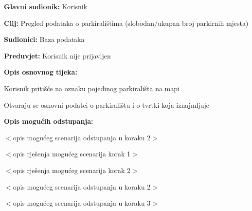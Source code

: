 \noindent {}
\begin{packed_item}
	
	\item \textbf{Glavni sudionik: } Korisnik
	\item  \textbf{Cilj:} Pregled podataka o parkiralištima (slobodan/ukupan broj parkirnih mjesta)
	\item  \textbf{Sudionici:} Baza podataka
	\item  \textbf{Preduvjet:} Korisnik nije prijavljen
	\item  \textbf{Opis osnovnog tijeka:}
	
	\item[] \begin{packed_enum}
		
		\item Korisnik pritišće na oznaku pojedinog parkirališta na mapi
		\item Otvaraju se osnovni podatci o parkiralištu i o tvrtki koja iznajmljuje

	\end{packed_enum}
	
	\item  \textbf{Opis mogućih odstupanja:}
	
	\item[] \begin{packed_item}
		
		\item[2.a] $<$opis mogućeg scenarija odstupanja u koraku 2$>$
		\item[] \begin{packed_enum}
			
			\item $<$opis rješenja mogućeg scenarija korak 1$>$
			\item $<$opis rješenja mogućeg scenarija korak 2$>$
			
		\end{packed_enum}
		\item[2.b] $<$opis mogućeg scenarija odstupanja u koraku 2$>$
		\item[3.a] $<$opis mogućeg scenarija odstupanja  u koraku 3$>$
		
	\end{packed_item}
\end{packed_item}

